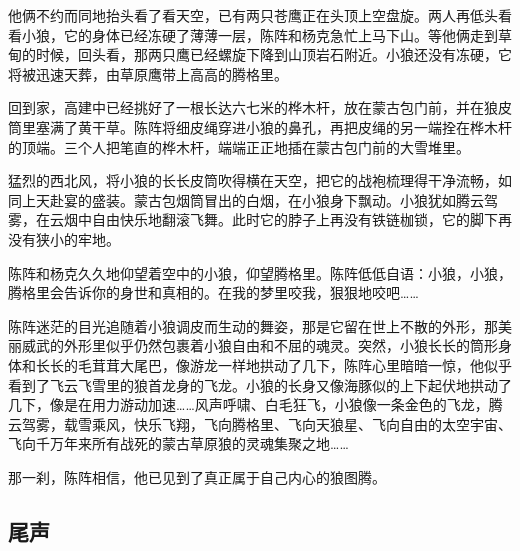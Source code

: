 \par 他俩不约而同地抬头看了看天空，已有两只苍鹰正在头顶上空盘旋。两人再低头看看小狼，它的身体已经冻硬了薄薄一层，陈阵和杨克急忙上马下山。等他俩走到草甸的时候，回头看，那两只鹰已经螺旋下降到山顶岩石附近。小狼还没有冻硬，它将被迅速天葬，由草原鹰带上高高的腾格里。
\par 回到家，高建中已经挑好了一根长达六七米的桦木杆，放在蒙古包门前，并在狼皮筒里塞满了黄干草。陈阵将细皮绳穿进小狼的鼻孔，再把皮绳的另一端拴在桦木杆的顶端。三个人把笔直的桦木杆，端端正正地插在蒙古包门前的大雪堆里。
\par 猛烈的西北风，将小狼的长长皮筒吹得横在天空，把它的战袍梳理得干净流畅，如同上天赴宴的盛装。蒙古包烟筒冒出的白烟，在小狼身下飘动。小狼犹如腾云驾雾，在云烟中自由快乐地翻滚飞舞。此时它的脖子上再没有铁链枷锁，它的脚下再没有狭小的牢地。
\par 陈阵和杨克久久地仰望着空中的小狼，仰望腾格里。陈阵低低自语：小狼，小狼，腾格里会告诉你的身世和真相的。在我的梦里咬我，狠狠地咬吧……
\par 陈阵迷茫的目光追随着小狼调皮而生动的舞姿，那是它留在世上不散的外形，那美丽威武的外形里似乎仍然包裹着小狼自由和不屈的魂灵。突然，小狼长长的筒形身体和长长的毛茸茸大尾巴，像游龙一样地拱动了几下，陈阵心里暗暗一惊，他似乎看到了飞云飞雪里的狼首龙身的飞龙。小狼的长身又像海豚似的上下起伏地拱动了几下，像是在用力游动加速……风声呼啸、白毛狂飞，小狼像一条金色的飞龙，腾云驾雾，载雪乘风，快乐飞翔，飞向腾格里、飞向天狼星、飞向自由的太空宇宙、飞向千万年来所有战死的蒙古草原狼的灵魂集聚之地……
\par 那一刹，陈阵相信，他已见到了真正属于自己内心的狼图腾。

\subsection*{尾声}


